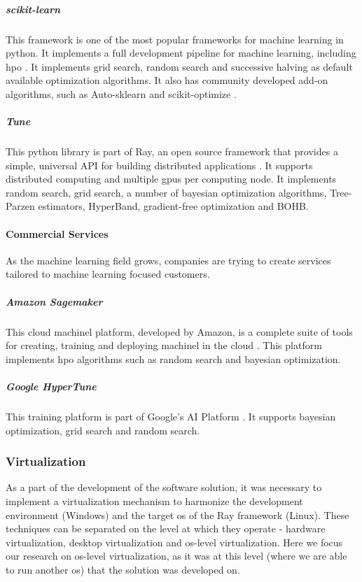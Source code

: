 \subparagraph{scikit-learn} This framework is one of the most popular frameworks for machine learning in \acrshort{python}. It implements a full development pipeline for machine learning, including \acrshort{hpo} \parencite{scikit-learn}. It implements grid search, random search and successive halving as default available optimization algorithms. It also has community developed add-on algorithms, such as Auto-sklearn \parencite{auto-sklearn} and scikit-optimize \parencite{scikit-optimize}.

\subparagraph{Tune} This \acrshort{python} library is part of Ray, an open source framework that provides a simple, universal API for building distributed applications \parencite{ray}. It supports distributed computing and multiple \acrshort{gpu}s per computing node. It implements random search, grid search, a number of bayesian optimization algorithms, Tree-Parzen estimators, HyperBand, gradient-free optimization and BOHB.

\paragraph{Commercial Services} 

As the machine learning field grows, companies are trying to create services tailored to machine learning focused customers.

\subparagraph{Amazon Sagemaker} This cloud \acrshort{machinel} platform, developed by Amazon, is a complete suite of tools for creating, training and deploying \acrshort{machinel} in the cloud \parencite{sagemaker}. This platform implements \acrshort{hpo} algorithms such as random search and bayesian optimization.

\subparagraph{Google HyperTune} This training platform is part of Google's AI Platform \parencite{ghypertune}. It supports bayesian optimization, grid search and random search.   

\subsubsection{Virtualization}


As a part of the development of the software solution, it was necessary to implement a virtualization mechanism to harmonize the development environment (Windows) and the target \acrfull{os} of the Ray framework (Linux). These techniques can be separated on the level at which they operate - hardware virtualization, desktop virtualization and \acrshort{os}-level virtualization. Here we focus our research on \acrshort{os}-level virtualization, as it was at this level (where we are able to run another \acrshort{os}) that the solution was developed on.

